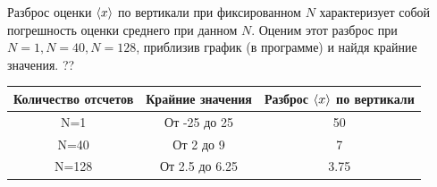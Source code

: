 \begin{enumerate}
Разброс оценки $\langle x\rangle$ по вертикали при фиксированном $N$ характеризует собой погрешность оценки среднего при данном $N$. 
Оценим этот разброс при $N=1, N=40, N=128$, приблизив график (в программе) и найдя крайние значения. ??

\begin{table}[h!]
	\centering
	\begin{tabular}{|c|c|c|}
		\hline
		\textbf{Количество отсчетов} & \textbf{Крайние значения} &{\textbf{Разброс $\langle x\rangle$ по вертикали}} \\
		\hline
		N=1   & От -25 до 25 & 50 \\
		\hline
		N=40  & От 2 до 9 & 7 \\
		\hline
		N=128 & От 2.5 до 6.25 & 3.75 \\
		\hline
	\end{tabular}%
\end{table}%
\end{enumerate}




